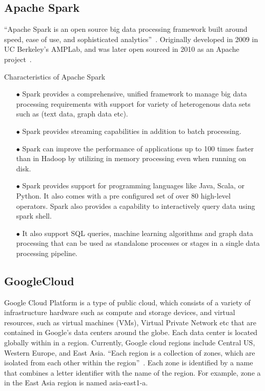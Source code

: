 \subsection{Apache Spark}
``Apache Spark is an open source big data processing framework built around speed, ease of use, and sophisticated analytics''~\cite{hid-sp18-510-spark}. Originally developed in 2009 in UC Berkeley’s AMPLab, and was later open sourced in 2010 as an Apache project~\cite{hid-sp18-510-spark}.

Characteristics of Apache Spark
\begin{itemize}
	\item[$\bullet$] Spark provides a comprehensive, unified framework to manage big data processing requirements with support for variety of heterogenous data sets such as (text data, graph data etc).
	\item[$\bullet$] Spark provides streaming capabilities in addition to batch processing.
	\item[$\bullet$] Spark can improve the performance of applications up to 100 times faster than in Hadoop by utilizing in memory processing even when running on disk.
	\item[$\bullet$] Spark provides support for programming languages like Java, Scala, or Python. It also comes with a pre configured set of over 80 high-level operators. Spark also provides a capability to interactively query data using spark shell.
	\item[$\bullet$] It also support SQL queries, machine learning algorithms and graph data processing that can be used as standalone processes or stages in a single data processing pipeline.
\end{itemize}

\subsection{GoogleCloud}
Google Cloud Platform is a type of public cloud, which consists of a variety of infrastructure hardware such as compute and storage devices, and virtual resources, such as virtual machines (VMs), Virtual Private Network etc that are contained in Google's data centers around the globe. Each data center is located globally within in a region. Currently, Google cloud regions include Central US, Western Europe, and East Asia. ``Each region is a collection of zones, which are isolated from each other within the region''~\cite{hid-sp18-510-gcp}. Each zone is identified by a name that combines a letter identifier with the name of the region. For example, zone a in the East Asia region is named asia-east1-a.

